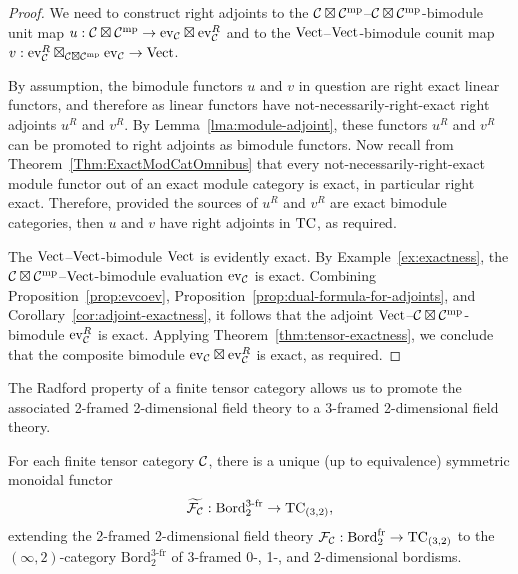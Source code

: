 \documentclass{amsart}
\begin{document}
\begin{proof}
We need to construct right adjoints to the $\mathcal C \boxtimes \mathcal C^{\mathrm{mp}}$--$\mathcal C \boxtimes \mathcal C^{\mathrm{mp}}$-bimodule unit map $u: \mathcal C \boxtimes \mathcal C^{\mathrm{mp}} \rightarrow \mathrm{ev}_\mathcal C \boxtimes \mathrm{ev}_\mathcal C^R$ and to the $\mathrm{Vect}$--$\mathrm{Vect}$-bimodule counit map $v: \mathrm{ev}_\mathcal C^R \boxtimes_{\mathcal C \boxtimes \mathcal C^{\mathrm{mp}}} \mathrm{ev}_\mathcal C \rightarrow \mathrm{Vect}$.

By assumption, the bimodule functors $u$ and $v$ in question are right exact linear functors, and therefore as linear functors have not-necessarily-right-exact right adjoints $u^R$ and $v^R$.  By Lemma~\ref{lma:module-adjoint}, these functors $u^R$ and $v^R$ can be promoted to right adjoints as bimodule functors.  Now recall from Theorem~\ref{Thm:ExactModCatOmnibus} that every not-necessarily-right-exact module functor out of an exact module category is exact, in particular right exact.  Therefore, provided the sources of $u^R$ and $v^R$ are exact bimodule categories, then $u$ and $v$ have right adjoints in $\mathrm{TC}$, as required.

The $\mathrm{Vect}$--$\mathrm{Vect}$-bimodule $\mathrm{Vect}$ is evidently exact.  By Example~\ref{ex:exactness}, the $\mathcal C \boxtimes \mathcal C^{\mathrm{mp}}$--$\mathrm{Vect}$-bimodule evaluation $\mathrm{ev}_\mathcal C$ is exact.  Combining Proposition~\ref{prop:evcoev}, Proposition~\ref{prop:dual-formula-for-adjoints}, and Corollary~\ref{cor:adjoint-exactness}, it follows that the adjoint $\mathrm{Vect}$--$\mathcal C \boxtimes \mathcal C^{\mathrm{mp}}$-bimodule $\mathrm{ev}_\mathcal C^R$ is exact.  Applying Theorem~\ref{thm:tensor-exactness}, we conclude that the composite bimodule $\mathrm{ev}_\mathcal C \boxtimes \mathrm{ev}_\mathcal C^R$ is exact, as required.
\end{proof}


The Radford property of a finite tensor category allows us to promote the associated 2-framed 2-dimensional field theory to a 3-framed 2-dimensional field theory.

\begin{corollary} \label{cor:3fr2d}
For each finite tensor category $\mathcal C$, there is a unique (up to equivalence) symmetric monoidal functor
\[
\widetilde{\mathcal F_\mathcal C} : \mathrm{Bord}^{3\text{-}\mathrm{fr}}_2 \rightarrow \mathrm{TC}_{(3,2)},
\]
extending the 2-framed 2-dimensional field theory $\mathcal F_\mathcal C: \mathrm{Bord}^\mathrm{fr}_2 \rightarrow \mathrm{TC}_{(3,2)}$ to the $(\infty,2)$-category $\mathrm{Bord}^{3\text{-}\mathrm{fr}}_2$ of 3-framed 0-, 1-, and 2-dimensional bordisms.
\end{corollary} 
\end{document}
